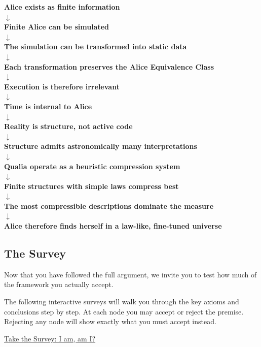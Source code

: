 \begin{center}
    \sffamily
    \textbf{Alice exists as finite information} \\
    $\downarrow$ \\
    \textbf{Finite Alice can be simulated} \\
    $\downarrow$ \\
    \textbf{The simulation can be transformed into static data} \\
    $\downarrow$ \\
    \textbf{Each transformation preserves the Alice Equivalence Class} \\
    $\downarrow$ \\
    \textbf{Execution is therefore irrelevant} \\
    $\downarrow$ \\
    \textbf{Time is internal to Alice} \\
    $\downarrow$ \\
    \textbf{Reality is structure, not active code} \\
    $\downarrow$ \\
    \textbf{Structure admits astronomically many interpretations} \\
    $\downarrow$ \\
    \textbf{Qualia operate as a heuristic compression system} \\
    $\downarrow$ \\
    \textbf{Finite structures with simple laws compress best} \\
    $\downarrow$ \\
    \textbf{The most compressible descriptions dominate the measure} \\
    $\downarrow$ \\
    \textbf{Alice therefore finds herself in a law-like, fine-tuned universe}
\end{center}

\subsection*{The Survey}

Now that you have followed the full argument, we invite you to test how much of the framework you actually accept.

The following interactive surveys will walk you through the key axioms and conclusions step by step.
At each node you may accept or reject the premise. Rejecting any node will show exactly what you must accept instead.

\href{https://meskanen.com/surveys/surveys.html}{Take the Survey: I am, am I?} 

